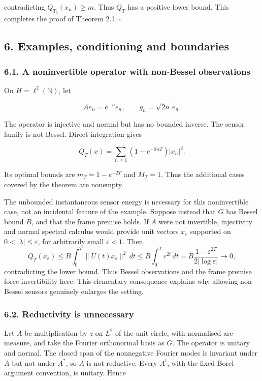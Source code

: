 \documentclass[
  11pt,
]{article}
\begin{document}
contradicting \(Q_{T_0}(x_n)\geq m\). Thus \(Q_T\) has a positive lower
bound. This completes the proof of Theorem 2.1. \(\square\)

\subsection{6. Examples, conditioning and
boundaries}\label{examples-conditioning-and-boundaries}

\subsubsection{6.1. A noninvertible operator with non-Bessel
observations}\label{a-noninvertible-operator-with-non-bessel-observations}

On \(H=\ell^2(\mathbb N)\), let

\[
Ae_n=e^{-n}e_n,\qquad g_n=\sqrt{2n}\,e_n.
\]

The operator is injective and normal but has no bounded inverse. The
sensor family is not Bessel. Direct integration gives

\[
Q_T(x)=\sum_{n\geq1}(1-e^{-2nT})|x_n|^2.        \tag{6.1}
\]

Its optimal bounds are \(m_T=1-e^{-2T}\) and \(M_T=1\). Thus the
additional cases covered by the theorem are nonempty.

The unbounded instantaneous sensor energy is necessary for this
noninvertible case, not an incidental feature of the example. Suppose
instead that \(G\) has Bessel bound \(B\), and that the frame premise
holds. If \(A\) were not invertible, injectivity and normal spectral
calculus would provide unit vectors \(x_\varepsilon\) supported on
\(0<|\lambda|\leq\varepsilon\), for arbitrarily small \(\varepsilon<1\).
Then \[
Q_T(x_\varepsilon)\leq B\int_0^T\|U(t)x_\varepsilon\|^2\,dt
\leq B\int_0^T\varepsilon^{2t}\,dt
=B\frac{1-\varepsilon^{2T}}{2|\log\varepsilon|}\longrightarrow0,
\] contradicting the lower bound. Thus Bessel observations and the frame
premise force invertibility here. This elementary consequence explains
why allowing non-Bessel sensors genuinely enlarges the setting.

\subsubsection{6.2. Reductivity is
unnecessary}\label{reductivity-is-unnecessary}

Let \(A\) be multiplication by \(z\) on \(L^2\) of the unit circle, with
normalised arc measure, and take the Fourier orthonormal basis as \(G\).
The operator is unitary and normal. The closed span of the nonnegative
Fourier modes is invariant under \(A\) but not under \(A^*\), so \(A\)
is not reductive. Every \(A^t\), with the fixed Borel argument
convention, is unitary. Hence
\end{document}
